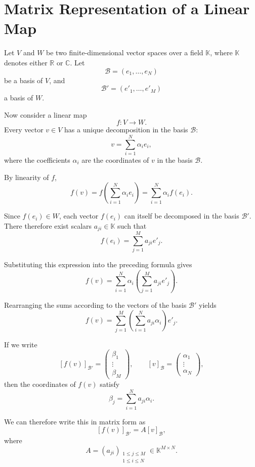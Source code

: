 \chapter{Matrix Representation of a Linear Map}
\label{app:representation-lineaire-matrice}

Let $V$ and $W$ be two finite-dimensional vector spaces over a field
$\mathbb{K}$, where $\mathbb{K}$ denotes either $\mathbb{R}$ or $\mathbb{C}$.
Let
\[
\mathcal{B} = (e_1,\dots,e_N)
\]
be a basis of $V$, and
\[
\mathcal{B}' = (e'_1,\dots,e'_M)
\]
a basis of $W$.

Now consider a linear map
\[
f : V \rightarrow W.
\]
Every vector $v \in V$ has a unique decomposition in the basis $\mathcal{B}$:
\[
v = \sum_{i=1}^{N} \alpha_i e_i,
\]
where the coefficients $\alpha_i$ are the coordinates of $v$ in the basis $\mathcal{B}$.

By linearity of $f$,
\[
f(v)
=
f\left(\sum_{i=1}^{N} \alpha_i e_i\right)
=
\sum_{i=1}^{N} \alpha_i f(e_i).
\]

Since $f(e_i) \in W$, each vector $f(e_i)$ can itself be decomposed in the basis
$\mathcal{B}'$. There therefore exist scalars $a_{j i} \in \mathbb{K}$ such that
\[
f(e_i)
=
\sum_{j=1}^{M} a_{j i} e'_j.
\]

Substituting this expression into the preceding formula gives
\[
f(v)
=
\sum_{i=1}^{N} \alpha_i
\left(
\sum_{j=1}^{M} a_{j i} e'_j
\right).
\]

Rearranging the sums according to the vectors of the basis $\mathcal{B}'$ yields
\[
f(v)
=
\sum_{j=1}^{M}
\left(
\sum_{i=1}^{N} a_{j i}\alpha_i
\right)
e'_j.
\]

If we write
\[
[f(v)]_{\mathcal{B}'}
=
\begin{pmatrix}
\beta_1 \\
\vdots \\
\beta_M
\end{pmatrix},
\qquad
[v]_{\mathcal{B}}
=
\begin{pmatrix}
\alpha_1 \\
\vdots \\
\alpha_N
\end{pmatrix},
\]
then the coordinates of $f(v)$ satisfy
\[
\beta_j
=
\sum_{i=1}^{N} a_{j i}\alpha_i.
\]

We can therefore write this in matrix form as
\[
[f(v)]_{\mathcal{B}'}
=
A [v]_{\mathcal{B}},
\]
where
\[
A =
(a_{j i})_{\substack{1 \leq j \leq M \\ 1 \leq i \leq N}}
\in \mathbb{K}^{M \times N}.
\]

